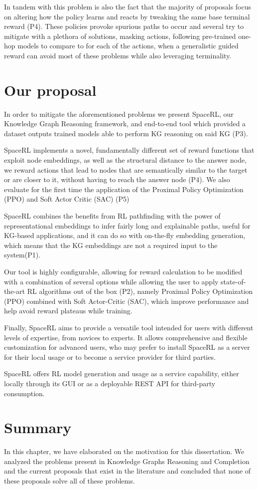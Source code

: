 In tandem with this problem is also the fact that the majority of proposals focus on altering how the policy learns and reacts by tweaking the same base terminal reward (P4). These policies provoke spurious paths to occur and several \cite{} try to mitigate with a plethora of solutions, masking actions, following pre-trained one-hop models to compare to for each of the actions, when a generalistic guided reward can avoid most of these problems while also leveraging terminality.

\section{Our proposal}\label{sec:moti-proposal}
In order to mitigate the aforementioned problems we present SpaceRL, our Knowledge Graph Reasoning framework, and end-to-end tool which provided a dataset outputs trained models able to perform KG reasoning on said KG (P3).

SpaceRL implements a novel, fundamentally different set of reward functions that exploit node embeddings, as well as the structural distance to the answer node, we reward actions that lead to nodes that are semantically similar to the target or are closer to it, without having to reach the answer node (P4). We also evaluate for the first time the application of the Proximal Policy Optimization (PPO) and Soft Actor Critic (SAC) (P5)

SpaceRL combines the benefits from RL pathfinding with the power of representational embeddings to infer fairly long and explainable paths, useful for KG-based applications, and it can do so with on-the-fly embedding generation, which means that the KG embeddings are not a required input to the system(P1).

Our tool is highly configurable, allowing for reward calculation to be modified with a combination of several options while allowing the user to apply state-of-the-art RL algorithms out of the box (P2), namely Proximal Policy Optimization (PPO)\cite{schulman2017proximal} combined with Soft Actor-Critic (SAC)\cite{haarnoja2018soft}, which improve performance and help avoid reward plateaus while training.

Finally, SpaceRL aims to provide a versatile tool intended for users with different levels of expertise, from novices to experts. It allows comprehensive and flexible customization for advanced users, who may prefer to install SpaceRL as a server for their local usage or to become a service provider for third parties.

SpaceRL offers RL model generation and usage as a service capability, either locally through its GUI or as a deployable REST API for third-party consumption. 

\section{Summary}\label{sec:moti-summary}
In this chapter, we have elaborated on the motivation for this dissertation. We analyzed the problems present in Knowledge Graphs Reasoning and Completion and the current proposals that exist in the literature and concluded that none of these proposals solve all of these problems.